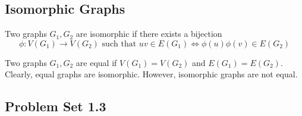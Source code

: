 \subsection{Isomorphic Graphs}
\begin{definition}[isomorphism]
	Two graphs $G_1,G_2$ are isomorphic if there exists a bijection $$\phi : V(G_1) \to V(G_2) \text{ such that }uv \in E(G_1) \iff \phi(u)\phi(v) \in E(G_2)$$
\end{definition}
\begin{remark}
	Two graphs $G_1,G_2$ are equal if $V(G_1) = V(G_2)$ and $E(G_1) = E(G_2)$. Clearly, equal graphs are isomorphic. However, isomorphic graphs are not equal.
\end{remark}

\subsection*{Problem Set 1.3}
